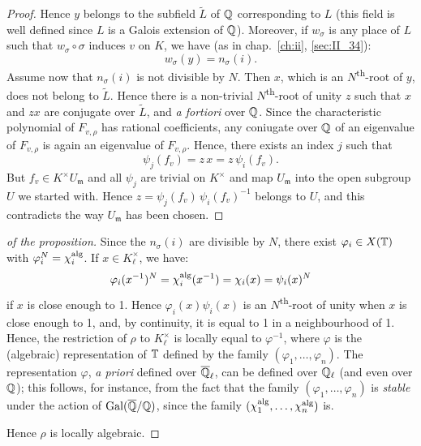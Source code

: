 \begin{proof}
	Hence $y$ belongs to the subfield $\widetilde{L}$ of $\mathbb{Q}$ corresponding
	to $L$ (this field is well defined since $L$ is a Galois extension of
	$\mathbb{Q}$).  Moreover, if $w_\sigma$ is any place of $L$ such that $w_\sigma
	\circ \sigma$ induces $v$ on $K$, we have (as in chap.~\ref{ch:ii},
	\ref{sec:II_34}):
	\[
		w_\sigma(y) = n_\sigma(i).
	\]
	Assume now that $n_\sigma(i)$ is not divisible by $N$. Then $x$, which
	is an $N$\textsuperscript{th}-root of $y$, does not belong to
	$\widetilde{L}$. Hence there is a
	\dpage
	non-trivial $N$\textsuperscript{th}-root of unity $z$ such that $x$ and
	$zx$ are conjugate over $\widetilde{L}$, and \emph{a fortiori} over
	$\mathbb{Q}$. Since the characteristic polynomial of $F_{v, \rho}$ has rational
	coefficients, any coniugate over $\mathbb{Q}$ of an eigenvalue of $F_{v, \rho}$
	is again an eigenvalue of $F_{v, \rho}$. Hence, there exists an index
	$j$ such that
	\[
		\psi_j(f_v) = z\, x = z\, \psi_i(f_v).
	\]
	But $f_v \in K^\times U_{\mathfrak{m}}$ and all $\psi_j$ are trivial on
	$K^\times$ and map $U_{\mathfrak{m}}$ into the open subgroup $U$ we
	started with. Hence $z = \psi_j(f_v) \, \psi_i(f_v)^{-1}$ belongs to
	$U$, and this contradicts the way $U_{\mathfrak{m}}$ has been chosen.
\end{proof}

\begin{proof}[ of the proposition]
	Since the $n_\sigma(i)$ are divisible by $N$, there exist $\varphi_i
	\in X(\mathbb{T})$ with $\varphi_i^N = \chi_i^{\rm alg}$. If $x \in
	K_\ell^\times$, we have:
	\[
		\varphi_i(x^{-1})^N = \chi_i^{\rm alg}(x^{-1}) = \chi_i(x) =
		\psi_i(x)^N
	\]
	if $x$ is close enough to 1. Hence $\varphi_i(x) \psi_i(x)$ is an
	$N$\textsuperscript{th}-root of unity when $x$ is close enough to 1,
	and, by continuity, it is equal to 1 in a neighbourhood of 1. Hence,
	the restriction of $\rho$ to $K_\ell^\times$ is locally equal to
	$\varphi^{-1}$, where $\varphi$ is the (algebraic) representation of
	$\mathbb{T}$ defined by the family $(\varphi_1, \dots, \varphi_n)$. The
	representation $\varphi$, \emph{a priori} defined over $\overline{\mathbb{Q}}_\ell$,
	can be defined over $\mathbb{Q}_\ell$ (and even over $\mathbb{Q}$); this follows, for
	instance, from the fact that the family $(\varphi_1, \dots, \varphi_n)$
	is \emph{stable} under the action of $\operatorname{Gal}(\overline{\mathbb{Q}}/\mathbb{Q})$, since the
	family $(\chi_1^{\rm alg}, \dots, \chi_n^{\rm alg})$ is.

	Hence $\rho$ is locally algebraic.
\end{proof}

\dpage

